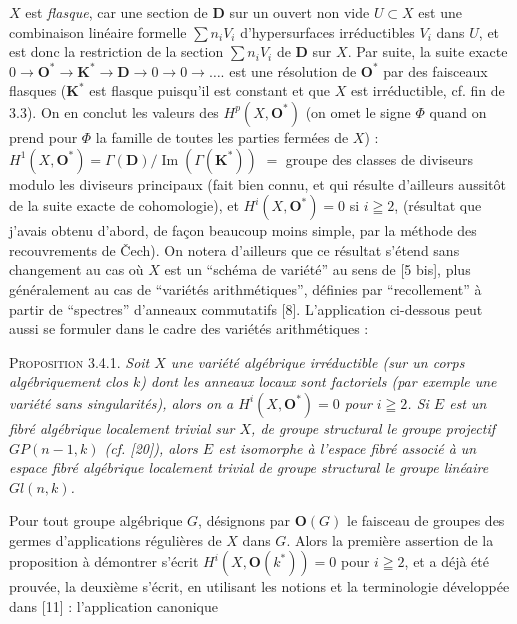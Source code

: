 
\noindent $X$ est \textit{flasque}, car une section de $\mathbf D$ sur un ouvert non
vide $U\subset X$ est une combinaison linéaire formelle
$\sum n_iV_i$ d'hypersurfaces irréductibles $V_i$ dans $U$, et est donc la
restriction de la section $\sum n_iV_i$ de $\mathbf D$ sur $X$. Par suite,
la suite exacte 
$0\to\mathbf O^*\to\mathbf K^*\to\mathbf D\to0\to0\to\ldots.$
est une résolution de $\mathbf O^*$ par des faisceaux flasques
($\mathbf K^*$ est flasque puisqu'il est constant et que $X$ est
irréductible, cf. fin de 3.3). On en conclut les valeurs des
$H^p(X,\mathbf O^*)$ (on omet le signe $\Phi$ quand on prend pour $\Phi$ la
famille de toutes les parties fermées de $X$) :
$H^1(X,\mathbf O^*)=\Gamma(\mathbf D)/\operatorname{Im}(\Gamma(\mathbf K^*))$
$={}$ groupe des classes de diviseurs modulo les diviseurs principaux (fait
bien connu, et qui résulte d'ailleurs aussitôt de la suite exacte de
cohomologie), et $H^i(X,\mathbf O^*)=0$ si $i\geqq2$, (résultat que j'avais
obtenu d'abord, de façon beaucoup moins simple, par la méthode des
recouvrements de Čech). On notera d'ailleurs que ce résultat s'étend sans
changement au cas où $X$ est un ``schéma de variété'' au sens de
[5 bis], plus généralement au cas de ``variétés arithmétiques'',
définies par ``recollement'' à partir de ``spectres'' d'anneaux
commutatifs [8]. L'application ci-dessous peut aussi se formuler dans le
cadre des variétés arithmétiques :

\indent\textsc{Proposition 3.4.1.} \textit{Soit $X$ une variété algébrique
irréductible \textup{(}sur un corps algébriquement clos $k$\textup{)} dont les anneaux locaux
sont factoriels \textup{(}par exemple une variété sans singularités\textup{)}, alors on a
$H^i(X,\mathbf O^*)=0$ pour $i\geqq2$. Si $E$ est un fibré algébrique
localement trivial sur $X$, de groupe structural le groupe projectif
$\mathit{GP}(n-1,k)$ \textup{(}cf. \textup{[20])}, alors $E$ est isomorphe à l'espace
fibré associé à un espace fibré algébrique localement trivial de groupe
structural le groupe linéaire $\mathit{Gl}(n,k)$.}

Pour tout groupe algébrique $G$, désignons par $\mathbf O(G)$ le faisceau de
groupes des germes d'applications régulières de $X$ dans $G$. Alors la
première assertion de la proposition à démontrer s'écrit
$H^i(X,\mathbf O(k^*))=0$ pour $i\geqq2$, et a déjà été prouvée, la deuxième
s'écrit, en utilisant les notions et la terminologie développée dans [11] :
l'application canonique

